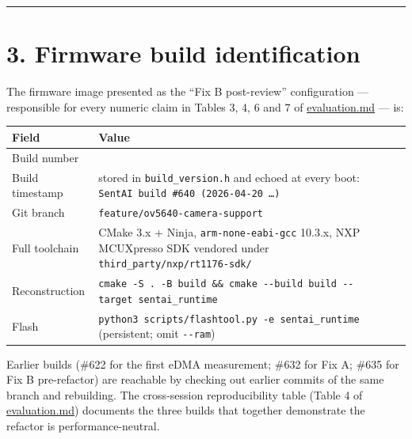 \begin{center}\rule{0.5\linewidth}{0.5pt}\end{center}

\section{3. Firmware build
identification}\label{firmware-build-identification}

The firmware image presented as the ``Fix B post-review'' configuration
--- responsible for every numeric claim in Tables 3, 4, 6 and 7 of
\url{evaluation.md} --- is:

{\def\LTcaptype{none} %
\begin{longtable}[]{@{}
  >{\raggedright\arraybackslash}p{}
  >{\raggedright\arraybackslash}p{}@{}}
\toprule\noalign{}
\begin{minipage}[b]{\linewidth}\raggedright
Field
\end{minipage} & \begin{minipage}[b]{\linewidth}\raggedright
Value
\end{minipage} \\
\midrule\noalign{}
\endhead
\bottomrule\noalign{}
\endlastfoot
Build number & 640 \\
Build timestamp & stored in \texttt{build\_version.h} and echoed at
every boot: \texttt{SentAI\ build\ \#640\ (2026-04-20\ …)} \\
Git branch & \texttt{feature/ov5640-camera-support} \\
Full toolchain & CMake 3.x + Ninja, \texttt{arm-none-eabi-gcc} 10.3.x,
NXP MCUXpresso SDK vendored under
\texttt{third\_party/nxp/rt1176-sdk/} \\
Reconstruction &
\texttt{cmake\ -S\ .\ -B\ build\ \&\&\ cmake\ -\/-build\ build\ -\/-target\ sentai\_runtime} \\
Flash & \texttt{python3\ scripts/flashtool.py\ -e\ sentai\_runtime}
(persistent; omit \texttt{-\/-ram}) \\
\end{longtable}
}

Earlier builds (\#622 for the first eDMA measurement; \#632 for Fix A;
\#635 for Fix B pre-refactor) are reachable by checking out earlier
commits of the same branch and rebuilding. The cross-session
reproducibility table (Table 4 of \url{evaluation.md}) documents the
three builds that together demonstrate the refactor is
performance-neutral.

